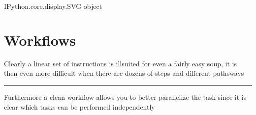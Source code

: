 \documentclass[letterpaper,10pt,english]{sphinxmanual}
\begin{document}
\begin{sphinxVerbatim}[commandchars=\\\{\}]
\PYGZlt{}IPython.core.display.SVG object\PYGZgt{}
\end{sphinxVerbatim}


\section{Workflows}
\label{\detokenize{01-Introduction:workflows}}
\sphinxAtStartPar
Clearly a linear set of instructions is ill\sphinxhyphen{}suited for even a fairly easy soup, it is then even more difficult when there are dozens of steps and different pathsways


\bigskip\hrule\bigskip


\sphinxAtStartPar
Furthermore a clean workflow allows you to better parallelize the task since it is clear which tasks can be performed independently
\end{document}
